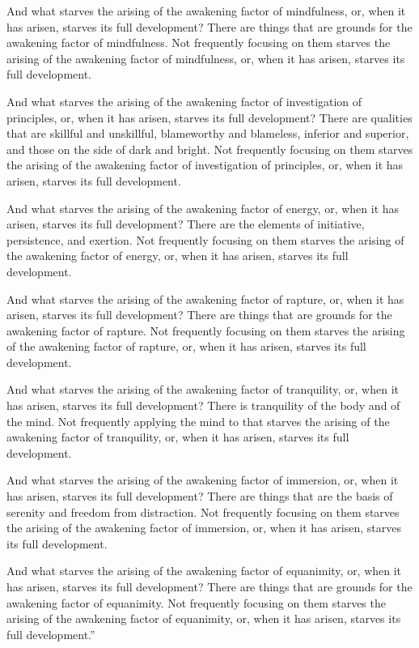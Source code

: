\documentclass[12pt,openany]{book}%
\begin{document}
And what starves the arising of the awakening factor of mindfulness, or, when it has arisen, starves its full development? There are things that are grounds for the awakening factor of mindfulness. Not frequently focusing on them starves the arising of the awakening factor of mindfulness, or, when it has arisen, starves its full development. 

And what starves the arising of the awakening factor of investigation of principles, or, when it has arisen, starves its full development? There are qualities that are skillful and unskillful, blameworthy and blameless, inferior and superior, and those on the side of dark and bright. Not frequently focusing on them starves the arising of the awakening factor of investigation of principles, or, when it has arisen, starves its full development. 

And what starves the arising of the awakening factor of energy, or, when it has arisen, starves its full development? There are the elements of initiative, persistence, and exertion. Not frequently focusing on them starves the arising of the awakening factor of energy, or, when it has arisen, starves its full development. 

And what starves the arising of the awakening factor of rapture, or, when it has arisen, starves its full development? There are things that are grounds for the awakening factor of rapture. Not frequently focusing on them starves the arising of the awakening factor of rapture, or, when it has arisen, starves its full development. 

And what starves the arising of the awakening factor of tranquility, or, when it has arisen, starves its full development? There is tranquility of the body and of the mind. Not frequently applying the mind to that starves the arising of the awakening factor of tranquility, or, when it has arisen, starves its full development. 

And what starves the arising of the awakening factor of immersion, or, when it has arisen, starves its full development? There are things that are the basis of serenity and freedom from distraction. Not frequently focusing on them starves the arising of the awakening factor of immersion, or, when it has arisen, starves its full development. 

And what starves the arising of the awakening factor of equanimity, or, when it has arisen, starves its full development? There are things that are grounds for the awakening factor of equanimity. Not frequently focusing on them starves the arising of the awakening factor of equanimity, or, when it has arisen, starves its full development.” 
\end{document}
